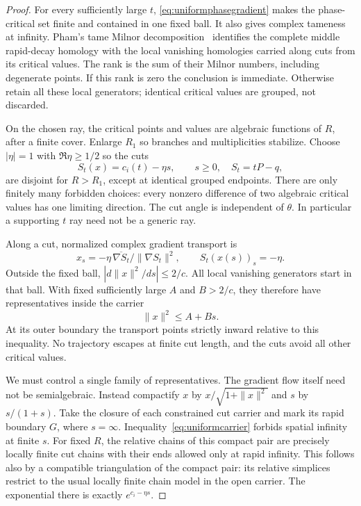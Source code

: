 \begin{proof}
For every sufficiently large $t$, \eqref{eq:uniformphasegradient}
makes the phase-critical set finite and contained in one fixed
ball. It also gives complex tameness at infinity. Pham's tame
Milnor decomposition~\cite[Part~I and Appendix]{Pham} identifies
the complete middle rapid-decay homology with the local vanishing
homologies carried along cuts from its critical values. The rank
is the sum of their Milnor numbers, including degenerate points.
If this rank is zero the conclusion is immediate. Otherwise
retain all these local generators; identical critical values
are grouped, not discarded.

On the chosen ray, the critical points and values are algebraic
functions of $R$, after a finite cover. Enlarge $R_1$ so branches
and multiplicities stabilize. Choose $|\eta|=1$ with
$\Re\eta\ge1/2$ so the cuts
\[
 S_t(x)=c_i(t)-\eta s,\qquad s\ge0,\quad S_t=tP-q,
\]
are disjoint for $R>R_1$, except at identical grouped endpoints.
There are only finitely many forbidden choices: every nonzero
difference of two algebraic critical values has one limiting
direction. The cut angle is independent of $\theta$. In
particular a supporting $t$ ray need not be a generic ray.

Along a cut, normalized complex gradient transport is
\[
 x_s=-\eta\,\overline{\nabla S_t}/\|\nabla S_t\|^2,
               \qquad S_t(x(s))_s=-\eta.
\]
Outside the fixed ball,
$|d\|x\|^2/ds|\le2/c$. All local vanishing generators start
in that ball. With fixed sufficiently large $A$ and $B>2/c$,
they therefore have representatives inside the carrier
\begin{equation}\label{eq:uniformcarrier}
 \|x\|^2\le A+Bs.
\end{equation}
At its outer boundary the transport points strictly inward
relative to this inequality. No trajectory escapes at finite
cut length, and the cuts avoid all other critical values.

We must control a single family of representatives. The gradient
flow itself need not be semialgebraic. Instead compactify $x$
by $x/\sqrt{1+\|x\|^2}$ and $s$ by $s/(1+s)$. Take the closure
of each constrained cut carrier and mark its rapid boundary
$G$, where $s=\infty$. Inequality~\eqref{eq:uniformcarrier}
forbids spatial infinity at finite $s$. For fixed $R$, the
relative chains of this compact pair are precisely locally
finite cut chains with their ends allowed only at rapid
infinity. This follows also by a compatible triangulation of
the compact pair: its relative simplices restrict to the usual
locally finite chain model in the open carrier. The exponential
there is exactly $e^{c_i-\eta s}$.


\end{proof}
